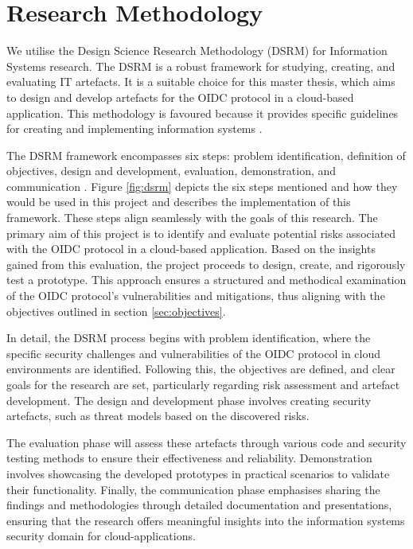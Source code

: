 \section{Research Methodology}
We utilise the Design Science Research Methodology (DSRM) for Information Systems research. The DSRM is a robust framework for studying, creating, and evaluating IT artefacts. It is a suitable choice for this master thesis, which aims to design and develop artefacts for the OIDC protocol in a cloud-based application.
This methodology is favoured because it provides specific guidelines for creating and implementing information systems \citep{dsrm}. \newline

The DSRM framework encompasses six steps: problem identification, definition of objectives, design and development, evaluation, demonstration, and communication \citep{dsrm}.
Figure \ref{fig:dsrm} depicts the six steps mentioned and how they would be used in this project and describes the implementation of this framework.
These steps align seamlessly with the goals of this research.
The primary aim of this project is to identify and evaluate potential risks associated with the OIDC protocol in a cloud-based application.
Based on the insights gained from this evaluation, the project proceeds to design, create, and rigorously test a prototype.
This approach ensures a structured and methodical examination of the OIDC protocol’s vulnerabilities and mitigations, thus aligning with the objectives outlined in section \ref{sec:objectives}.

In detail, the DSRM process begins with problem identification, where the specific security challenges and vulnerabilities of the OIDC protocol in cloud environments are identified.
Following this, the objectives are defined, and clear goals for the research are set, particularly regarding risk assessment and artefact development.
The design and development phase involves creating security artefacts, such as threat models based on the discovered risks.

The evaluation phase will assess these artefacts through various code and security testing methods to ensure their effectiveness and reliability.
Demonstration involves showcasing the developed prototypes in practical scenarios to validate their functionality.
Finally, the communication phase emphasises sharing the findings and methodologies through detailed documentation and presentations, ensuring that the research offers meaningful insights into the  information systems security domain for cloud-applications.

